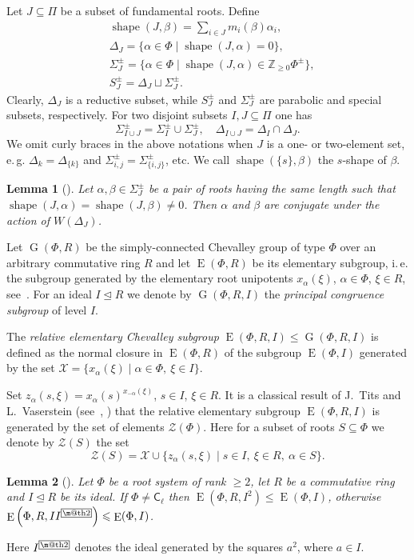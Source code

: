 \documentclass[11pt]{amsart}
\makeatletter
\theoremstyle{plain}
\numberwithin{equation}{section}
\newtheorem{lemma}{Lemma}
\numberwithin{lemma}{section}
\theoremstyle{definition}
\theoremstyle{remark}
\DeclareMathOperator{\G}{G}
\DeclareMathOperator{\E}{E}
\DeclareMathOperator{\shape}{shape}
\newcommand{\rC}{\mathsf{C}}
\newcommand{\indexbox}[1]{\text{\fboxsep=.1em\fbox{\m@th$\displaystyle#1$}}}
\makeatother
\begin{document}
Let $J\subseteq \Pi$ be a subset of fundamental roots. Define
\begin{align*}
& \shape(J, \beta)=\sum\nolimits_{i\in J} m_i(\beta) \alpha_i, \\
& \Delta_J = \{\alpha \in \Phi \mid \shape(J, \alpha)=0\}, \\
& \Sigma^\pm_J = \{\alpha \in \Phi \mid \shape(J, \alpha) \in \mathbb{Z}_{\geqslant0} \Phi^\pm \}, \\
& S_J^\pm = \Delta_J \sqcup \Sigma_J^\pm.
\end{align*}
Clearly, $\Delta_J$ is a reductive subset, while $S^\pm_J$ and $\Sigma^\pm_J$ are parabolic and special subsets, respectively.
For two disjoint subsets $I, J\subseteq \Pi$ one has 
\[ \Sigma^\pm_{I \cup J} = \Sigma^\pm_I\cup\Sigma^\pm_J, \quad \Delta_{I\cup J} = \Delta_I \cap \Delta_J. \]
We omit curly braces in the above notations when $J$ is a one- or two-element set, e.\,g. $\Delta_k=\Delta_{\{k\}}$ and $\Sigma_{i, j}^\pm=\Sigma_{\{i, j\}}^\pm$, etc. We call $\shape(\{s\}, \beta)$ the $s$-shape of $\beta$.

\begin{lemma}[{\cite[Lemma~1]{ABS}}]\label{lemma:abs}
Let $\alpha, \beta \in \Sigma^\pm_J$ be a pair of roots having the same length such that $\shape(J, \alpha)=\shape(J, \beta)\neq 0$.
Then $\alpha$ and $\beta$ are conjugate under the action of $W(\Delta_J)$.
\end{lemma}

Let $\G(\Phi, R)$ be the simply-connected Chevalley group of type $\Phi$ over an arbitrary commutative ring $R$ and let $\E(\Phi, R)$ be its elementary subgroup,
i.\,e. the subgroup generated by the elementary root unipotents $x_\alpha(\xi)$, $\alpha\in\Phi$, $\xi\in R$, see~\cite{VP, St78, S}.
For an ideal $I \trianglelefteq R$ we denote by $\G(\Phi, R, I)$ the \emph{principal congruence subgroup} of level $I$.

The \emph{relative elementary Chevalley subgroup} $\E(\Phi, R, I) \leqslant \G(\Phi, R, I)$ is defined as the normal closure in $\E(\Phi, R)$ of the subgroup $\E(\Phi, I)$ generated by the set $\mathcal{X} = \{x_\alpha(\xi) \mid \alpha\in \Phi, \ \xi \in I \}$.

Set $z_\alpha(s, \xi) = x_{\alpha}(s)^{x_{-\alpha}(\xi)}$, $s\in I$, $\xi\in R$.
It is a classical result of J.~Tits and L.~Vaserstein (see~\cite{Tits76}, \cite[Theorem~2]{Va86}) that the relative elementary subgroup $\E(\Phi, R, I)$ is generated by the set of elements $\mathcal{Z}(\Phi)$.
Here for a subset of roots $S\subseteq\Phi$ we denote by $\mathcal{Z}(S)$ the set
\[ \mathcal{Z}(S) =  \mathcal{X} \cup \{ z_\alpha(s, \xi) \mid s\in I, \ \xi \in R, \ \alpha \in S\}.\]
\begin{lemma}[{\cite[Corollary~3.3]{S}}]\label{lemma:Stepanov-ideal}
Let $\Phi$ be a root system of rank $\geqslant2$, let $R$ be a commutative ring and $I\trianglelefteq R$ be its ideal.
If $\Phi\neq\rC_\ell$ then $\E\left(\Phi, R, I^2\right)\leqslant\E(\Phi, I)$, otherwise $\E\left(\Phi, R, II^{\indexbox{2}}\right)\leqslant\E(\Phi, I)$.
\end{lemma}
Here $I^{\indexbox{2}}$ denotes the ideal generated by the squares $a^2$, where $a\in I$.
\end{document}
